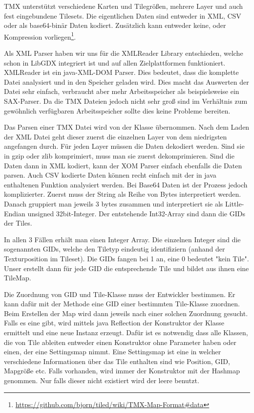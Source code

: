 TMX unterstützt verschiedene Karten und Tilegrößen, mehrere Layer und auch fest eingebundene Tilesets. Die eigentlichen Daten sind entweder in XML, CSV oder als base64-binär Daten kodiert. Zusätzlich kann entweder keine,  oder  Kompression vorliegen\footnote{\url{https://github.com/bjorn/tiled/wiki/TMX-Map-Format\#data}}.

Als XML Parser haben wir uns für die XMLReader Library entschieden, welche schon in LibGDX integriert ist und auf allen Zielplattformen funktioniert. XMLReader ist ein java-XML-DOM Parser. Dies bedeutet, dass die komplette Datei analysiert und in den Speicher geladen wird. Dies macht das Auswerten der Datei sehr einfach, verbraucht aber mehr Arbeitsspeicher als beispielsweise ein SAX-Parser. Da die TMX Dateien jedoch nicht sehr groß sind im Verhältnis zum gewöhnlich verfügbaren Arbeitsspeicher sollte dies keine Probleme bereiten.

Das Parsen einer TMX Datei wird von der Klasse  übernommen. Nach dem Laden der XML Datei geht dieser zuerst die einzelnen Layer von dem niedrigsten angefangen durch. Für jeden Layer müssen die Daten dekodiert werden. Sind sie in gzip oder zlib komprimiert, muss man sie zuerst dekomprimieren. Sind die Daten dann in XML kodiert, kann der XOM Parser einfach ebenfalls die Daten parsen. Auch CSV kodierte Daten können recht einfach mit der in java enthaltenen  Funktion analysiert werden.
Bei Base64 Daten ist der Prozess jedoch komplizierter. Zuerst muss der String als Reihe von Bytes interpretiert werden. Danach gruppiert man jeweils 3 bytes zusammen und interpretiert sie als Little-Endian unsigned 32bit-Integer. Der entstehende Int32-Array sind dann die GIDs der Tiles.

In allen 3 Fällen erhält man einen Integer Array. Die einzelnen Integer sind die sogenannten GIDs, welche den Tiletyp eindeutig identifiziern (anhand der Texturposition im Tileset).
Die GIDs fangen bei 1 an, eine 0 bedeutet "kein Tile". Unser  erstellt dann für jede GID die entsprechende Tile und bildet aus ihnen eine TileMap.

Die Zuordnung von GID und Tile-Klasse muss der Entwickler bestimmen. Er kann dafür mit der Methode  eine GID einer bestimmten Tile-Klasse zuordnen. Beim Erstellen der Map wird dann jeweils nach einer solchen Zuordnung gesucht. Falls es eine gibt, wird mittels java Reflection der Konstruktor der Klasse ermittelt und eine neue Instanz erzeugt. Dafür ist es notwendig dass alle Klassen, die von Tile ableiten entweder einen Konstruktor ohne Parameter haben oder einen, der eine Settingsmap nimmt. Eine Settingsmap ist eine  in welcher verschiedene Informationen über das Tile enthalten sind wie Position, GID, Mapgröße etc. Falls vorhanden, wird immer der Konstruktor mit der Hashmap genommen. Nur falls dieser nicht existiert wird der leere benutzt.

